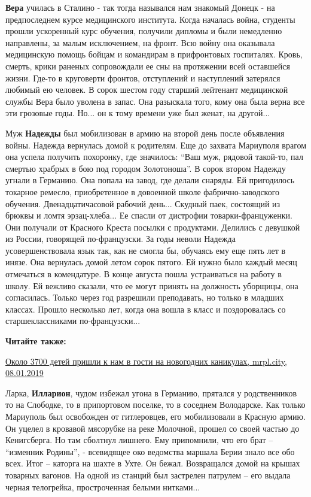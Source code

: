 \textbf{Вера} училась в Сталино - так тогда назывался нам знакомый Донецк - на
предпоследнем курсе медицинского института. Когда началась война, студенты
прошли ускоренный курс обучения, получили дипломы и были немедленно направлены,
за малым исключением, на фронт. Всю войну она оказывала медицинскую помощь
бойцам и командирам в прифронтовых госпиталях. Кровь, смерть, крики раненых
сопровождали ее сны на протяжении всей оставшейся жизни. Где-то в круговерти
фронтов, отступлений и наступлений затерялся любимый ею человек. В сорок шестом
году старший лейтенант медицинской службы Вера было уволена в запас. Она
разыскала того, кому она была верна все эти грозовые годы. Но... он к тому
времени уже был женат, на другой...

Муж \textbf{Надежды} был мобилизован в армию на второй день после объявления войны.
Надежда вернулась домой к родителям. Еще до захвата Мариуполя врагом она успела
получить похоронку, где значилось: \enquote{Ваш муж, рядовой такой-то, пал смертью
храбрых в бою под городом Золотоноша}. В сорок втором Надежду угнали в
Германию. Она попала на завод, где делали снаряды. Ей пригодилось токарное
ремесло, приобретенное в довоенной школе фабрично-заводского обучения.
Двенадцатичасовой рабочий день... Скудный паек, состоящий из брюквы и ломтя
эрзац-хлеба... Ее спасли от дистрофии товарки-француженки. Они получали от
Красного Креста посылки с продуктами. Делились с девушкой из России, говорящей
по-французски. За годы неволи Надежда усовершенствовала язык так, как не смогла
бы, обучаясь ему еще пять лет в инязе. Она вернулась домой летом сорок пятого.
Ей нужно было каждый месяц отмечаться в комендатуре. В конце августа пошла
устраиваться на работу в школу. Ей вежливо сказали, что ее могут принять на
должность уборщицы, она согласилась. Только через год разрешили преподавать, но
только в младших классах. Прошло несколько лет, когда она вошла в класс и
поздоровалась со старшеклассниками по-французски...

\textbf{Читайте также:} 

\href{https://mrpl.city/blogs/view/okolo-3700-detej-prishli-k-nam-v-gosti-na-novogodnih-kanikulah}{%
Около 3700 детей пришли к нам в гости на новогодних каникулах, mrpl.city, 08.01.2019}

Ларка, \textbf{Илларион}, чудом избежал угона в Германию, прятался у родственников то на
Слободке, то в припортовом поселке, то в соседнем Володарске. Как только
Мариуполь был освобожден от гитлеровцев, его мобилизовали в Красную армию. Он
уцелел в кровавой мясорубке на реке Молочной, прошел со своей частью до
Кенигсберга. Но там сболтнул лишнего. Ему припомнили, что его брат – \enquote{изменник
Родины}, - всевидящее око ведомства маршала Берии знало все обо всех. Итог –
каторга на шахте в Ухте. Он бежал. Возвращался домой на крышах товарных
вагонов. На одной из станций был застрелен патрулем – его выдала черная
телогрейка, простроченная белыми нитками...

